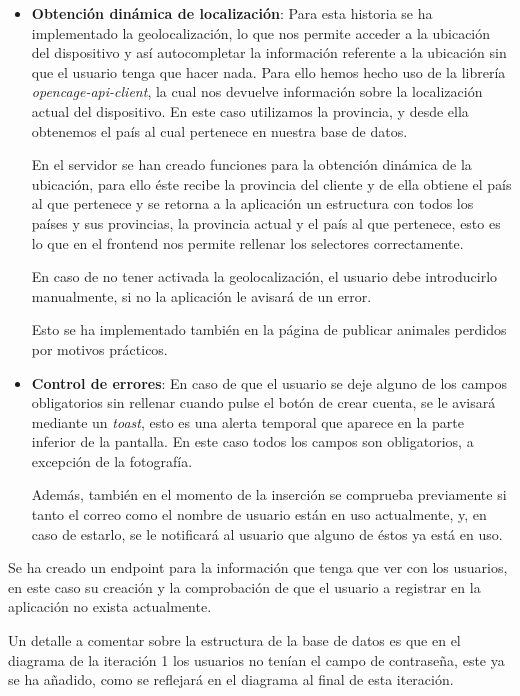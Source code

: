 \begin{itemize}
	\item \textbf{Obtención dinámica de localización}: Para esta historia se ha implementado la geolocalización, lo que nos permite acceder a la ubicación del dispositivo y así autocompletar la información referente a la ubicación sin que el usuario tenga que hacer nada. Para ello hemos hecho uso de la librería \textit{opencage-api-client}, la cual nos devuelve información sobre la localización actual del dispositivo. En este caso utilizamos la provincia, y desde ella obtenemos el país al cual pertenece en nuestra base de datos. 
	
	En el servidor se han creado funciones para la obtención dinámica de la ubicación, para ello éste recibe la provincia del cliente y de ella obtiene el país al que pertenece y se retorna a la aplicación un estructura con todos los países y sus provincias, la provincia actual y el país al que pertenece, esto es lo que en el frontend nos permite rellenar los selectores correctamente.
	
	En caso de no tener activada la geolocalización, el usuario debe introducirlo manualmente, si no la aplicación le avisará de un error.
	
	Esto se ha implementado también en la página de publicar animales perdidos por motivos prácticos.
	
	
	\item \textbf{Control de errores}: En caso de que el usuario se deje alguno de los campos obligatorios sin rellenar cuando pulse el botón de crear cuenta, se le avisará mediante un \textit{toast}, esto es una alerta temporal que aparece en la parte inferior de la pantalla. En este caso todos los campos son obligatorios, a excepción de la fotografía.
	
	Además, también en el momento de la inserción se comprueba previamente si tanto el correo como el nombre de usuario están en uso actualmente, y, en caso de estarlo, se le notificará al usuario que alguno de éstos ya está en uso.
\end{itemize}

Se ha creado un endpoint para la información que tenga que ver con los usuarios, en este caso su creación y la comprobación de que el usuario a registrar en la aplicación no exista actualmente.

Un detalle a comentar sobre la estructura de la base de datos es que en el diagrama de la iteración 1 los usuarios no tenían el campo de contraseña, este ya se ha añadido, como se reflejará en el diagrama al final de esta iteración. \\


